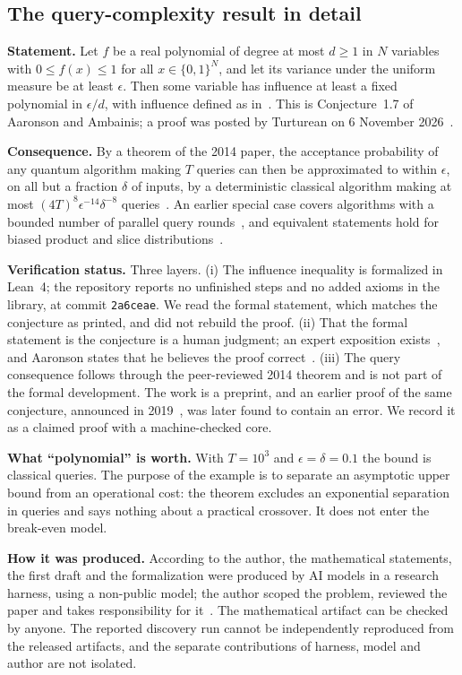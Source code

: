 \subsection{The query-complexity result in detail}
\label{app:query}
\textbf{Statement.} Let $f$ be a real polynomial of degree at most $d\ge1$ in $N$ variables with $0\le f(x)\le1$ for all $x\in\{0,1\}^N$, and let its variance under the uniform measure be at least $\epsilon$. Then some variable has influence at least a fixed polynomial in $\epsilon/d$, with influence defined as in~\cite{aa2014}. This is Conjecture~1.7 of Aaronson and Ambainis; a proof was posted by Turturean on 6 November 2026~\cite{turturean2026,psi2026}.

\textbf{Consequence.} By a theorem of the 2014 paper, the acceptance probability of any quantum algorithm making $T$ queries can then be approximated to within $\epsilon$, on all but a fraction $\delta$ of inputs, by a deterministic classical algorithm making at most $(4T)^8\epsilon^{-14}\delta^{-8}$ queries~\cite{turturean2026}. An earlier special case covers algorithms with a bounded number of parallel query rounds~\cite{bdst2026}, and equivalent statements hold for biased product and slice distributions~\cite{gmnr2026}.

\textbf{Verification status.} Three layers. (i) The influence inequality is formalized in Lean~4; the repository reports no unfinished steps and no added axioms in the library, at commit \texttt{2a6ceae}. We read the formal statement, which matches the conjecture as printed, and did not rebuild the proof. (ii) That the formal statement is the conjecture is a human judgment; an expert exposition exists~\cite{blancexpo2026}, and Aaronson states that he believes the proof correct~\cite{aaronsonblog2026}. (iii) The query consequence follows through the peer-reviewed 2014 theorem and is not part of the formal development. The work is a preprint, and an earlier proof of the same conjecture, announced in 2019~\cite{aaronson2019}, was later found to contain an error. We record it as a claimed proof with a machine-checked core.

\textbf{What ``polynomial'' is worth.} With $T=10^3$ and $\epsilon=\delta=0.1$ the bound is \aaBound{} classical queries. The purpose of the example is to separate an asymptotic upper bound from an operational cost: the theorem excludes an exponential separation in queries and says nothing about a practical crossover. It does not enter the break-even model.

\textbf{How it was produced.} According to the author, the mathematical statements, the first draft and the formalization were produced by AI models in a research harness, using a non-public model; the author scoped the problem, reviewed the paper and takes responsibility for it~\cite{turturean2026,psi2026}. The mathematical artifact can be checked by anyone. The reported discovery run cannot be independently reproduced from the released artifacts, and the separate contributions of harness, model and author are not isolated.
